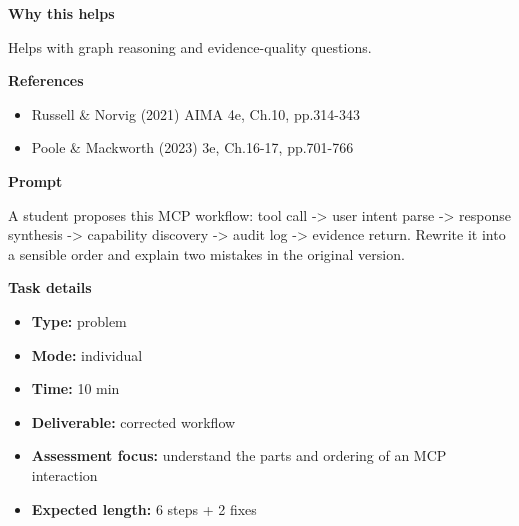 \documentclass[11pt]{article}
\begin{document}
\begin{tcolorbox}[colback=white,colframe=MidnightBlue,title={Q4 Graph Path, Provenance, and Context},fonttitle=\bfseries,breakable]
{\large\bfseries\color{MidnightBlue} Why this helps}\par\medskip
Helps with graph reasoning and evidence-quality questions.

{\large\bfseries\color{MidnightBlue} References}\par\medskip
\begin{itemize}\item Russell \& Norvig (2021) AIMA 4e, Ch.10, pp.314-343
\item Poole \& Mackworth (2023) 3e, Ch.16-17, pp.701-766\end{itemize}
\end{tcolorbox}

\begin{tcolorbox}[colback=white,colframe=MidnightBlue,title={Q5 MCP Workflow Check},fonttitle=\bfseries,breakable]
\begin{center}
\end{center}

{\large\bfseries\color{MidnightBlue} Prompt}\par\medskip
A student proposes this MCP workflow: tool call -\textgreater{} user intent parse -\textgreater{} response synthesis -\textgreater{} capability discovery -\textgreater{} audit log -\textgreater{} evidence return. Rewrite it into a sensible order and explain two mistakes in the original version.

{\large\bfseries\color{MidnightBlue} Task details}\par\medskip
\begin{itemize}\item \textbf{Type:} problem
\item \textbf{Mode:} individual
\item \textbf{Time:} 10 min
\item \textbf{Deliverable:} corrected workflow
\item \textbf{Assessment focus:} understand the parts and ordering of an MCP interaction
\item \textbf{Expected length:} 6 steps + 2 fixes\end{itemize}


\end{tcolorbox}
\end{document}
